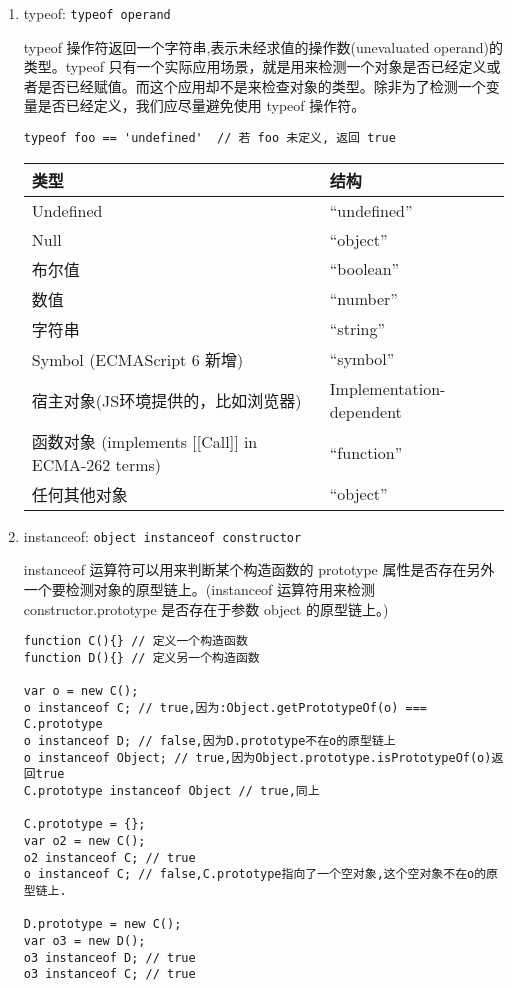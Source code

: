 \begin{enumerate}
\def\labelenumi{\arabic{enumi}.}
\item
  typeof: \lstinline!typeof operand!

  typeof 操作符返回一个字符串,表示未经求值的操作数(unevaluated
  operand)的类型。typeof
  只有一个实际应用场景，就是用来检测一个对象是否已经定义或者是否已经赋值。而这个应用却不是来检查对象的类型。除非为了检测一个变量是否已经定义，我们应尽量避免使用
  typeof 操作符。

\begin{lstlisting}
typeof foo == 'undefined'  // 若 foo 未定义, 返回 true
\end{lstlisting}

  \begin{longtable}[]{@{}ll@{}}
  \toprule
  类型 & 结构\tabularnewline
  \midrule
  \endhead
  Undefined & ``undefined''\tabularnewline
  Null & ``object''\tabularnewline
  布尔值 & ``boolean''\tabularnewline
  数值 & ``number''\tabularnewline
  字符串 & ``string''\tabularnewline
  Symbol (ECMAScript 6 新增) & ``symbol''\tabularnewline
  宿主对象(JS环境提供的，比如浏览器) &
  Implementation-dependent\tabularnewline
  函数对象 (implements {[}{[}Call{]}{]} in ECMA-262 terms) &
  ``function''\tabularnewline
  任何其他对象 & ``object''\tabularnewline
  \bottomrule
  \end{longtable}
\item
  instanceof: \lstinline!object instanceof constructor!

  instanceof 运算符可以用来判断某个构造函数的 prototype
  属性是否存在另外一个要检测对象的原型链上。(instanceof 运算符用来检测
  constructor.prototype 是否存在于参数 object 的原型链上。)

\begin{lstlisting}
function C(){} // 定义一个构造函数
function D(){} // 定义另一个构造函数

var o = new C();
o instanceof C; // true,因为:Object.getPrototypeOf(o) === C.prototype
o instanceof D; // false,因为D.prototype不在o的原型链上
o instanceof Object; // true,因为Object.prototype.isPrototypeOf(o)返回true
C.prototype instanceof Object // true,同上

C.prototype = {};
var o2 = new C();
o2 instanceof C; // true
o instanceof C; // false,C.prototype指向了一个空对象,这个空对象不在o的原型链上.

D.prototype = new C();
var o3 = new D();
o3 instanceof D; // true
o3 instanceof C; // true
\end{lstlisting}
\end{enumerate}

